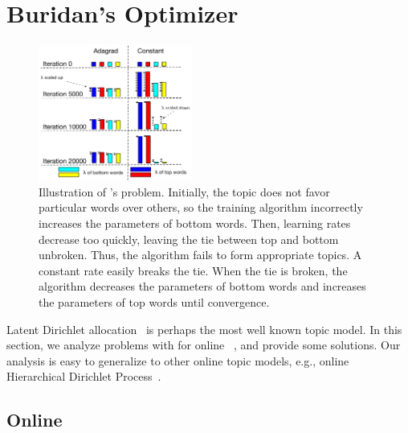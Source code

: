 \section{Buridan's Optimizer}
\label{sec:problems}

\begin{figure}[t]
	\centering
	\setlength{\abovecaptionskip}{0pt}
	\setlength{\belowcaptionskip}{0pt}
	\includegraphics[width=0.45\textwidth]{2017_emnlp_adagrad_olda/figures/evolution-of-lambda.pdf}

	\caption{Illustration of 's problem. Initially,
          the topic does not favor particular words over others, so the
          training algorithm incorrectly increases the parameters of
          bottom words. Then,  learning rates decrease too
          quickly, leaving the tie between top and bottom
          unbroken. Thus, the algorithm fails to form appropriate
          topics. A constant rate easily breaks the tie. When the tie
          is broken, the algorithm decreases the
          parameters of bottom words and increases the
          parameters of top words until convergence.}

	\label{fig:lambda_evolution_catroon}      
\end{figure}

Latent Dirichlet allocation~\cite[]{blei2003latent} is
perhaps the most well known topic model.  In this section, we analyze
problems with \adagrad{} for online
~\cite{hoffman2010online}, and provide some solutions. Our
analysis is easy to generalize to other online topic models, e.g.,
online Hierarchical Dirichlet
Process~\cite[]{wang2011online}.

\subsection{Online }

